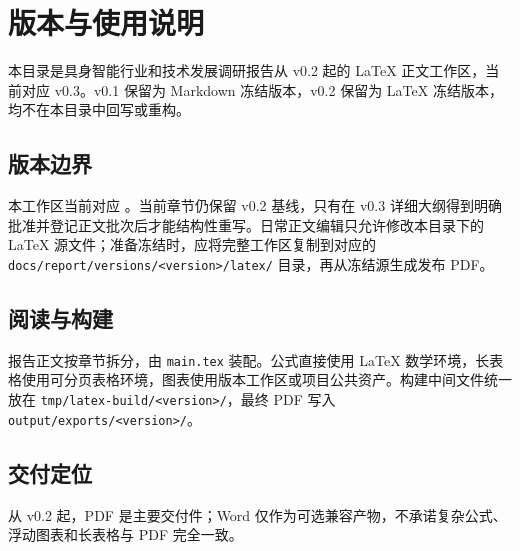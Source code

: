 \chapter*{版本与使用说明}

本目录是具身智能行业和技术发展调研报告从 v0.2 起的 LaTeX 正文工作区，当前对应 v0.3。v0.1 保留为 Markdown 冻结版本，v0.2 保留为 LaTeX 冻结版本，均不在本目录中回写或重构。

\section*{版本边界}
本工作区当前对应 \ReportVersion。当前章节仍保留 v0.2 基线，只有在 v0.3 详细大纲得到明确批准并登记正文批次后才能结构性重写。日常正文编辑只允许修改本目录下的 LaTeX 源文件；准备冻结时，应将完整工作区复制到对应的 \texttt{docs/report/versions/<version>/latex/} 目录，再从冻结源生成发布 PDF。

\section*{阅读与构建}
报告正文按章节拆分，由 \texttt{main.tex} 装配。公式直接使用 LaTeX 数学环境，长表格使用可分页表格环境，图表使用版本工作区或项目公共资产。构建中间文件统一放在 \texttt{tmp/latex-build/<version>/}，最终 PDF 写入 \texttt{output/exports/<version>/}。

\section*{交付定位}
从 v0.2 起，PDF 是主要交付件；Word 仅作为可选兼容产物，不承诺复杂公式、浮动图表和长表格与 PDF 完全一致。
